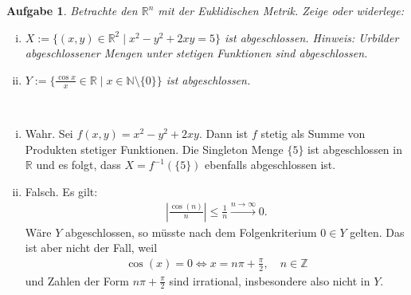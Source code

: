 \documentclass[a4paper, 20]{exam}
\newtheorem{ex}{Aufgabe}
\begin{document}
\begin{ex} Betrachte den $\mathbb{R}^n$ mit der Euklidischen Metrik. Zeige oder widerlege:
\begin{enumerate}[i)]
\item $X:= \{(x,y) \in \mathbb{R}^2 \mid x^2-y^2+2xy=5\}$ ist abgeschlossen. \textit{Hinweis}: Urbilder abgeschlossener Mengen unter stetigen Funktionen sind abgeschlossen.
\item $Y:= \{ \frac{\cos x}{x} \in \mathbb{R} \mid x \in \mathbb{N} \setminus \{0\}\} $ ist abgeschlossen. 
\end{enumerate}
\end{ex}


\begin{solution} \
\begin{enumerate}[i)]
\item Wahr. Sei $f(x,y)=x^2-y^2+2xy$. Dann ist $f$ stetig als Summe von Produkten stetiger Funktionen. Die Singleton Menge $\{5\}$ ist abgeschlossen in $\mathbb{R}$ und es folgt, dass $X= f^{-1}(\{5\})$ ebenfalls abgeschlossen ist. 
\item Falsch. Es gilt:
\begin{align*}
\left| \frac{\cos (n)}{n} \right| \leq \frac{1}{n} \xrightarrow{n \to \infty} 0.
\end{align*}
Wäre $Y$ abgeschlossen, so müsste nach dem Folgenkriterium $0 \in Y$ gelten. Das ist aber nicht der Fall, weil 
\begin{align*}
\cos (x)=0 \iff x = n \pi + \frac{\pi}{2}, \quad n \in \mathbb{Z}
\end{align*}
und Zahlen der Form $n \pi + \frac{\pi}{2}$ sind irrational, insbesondere also nicht in $Y$. 
\end{enumerate}
\end{solution}
\end{document}
